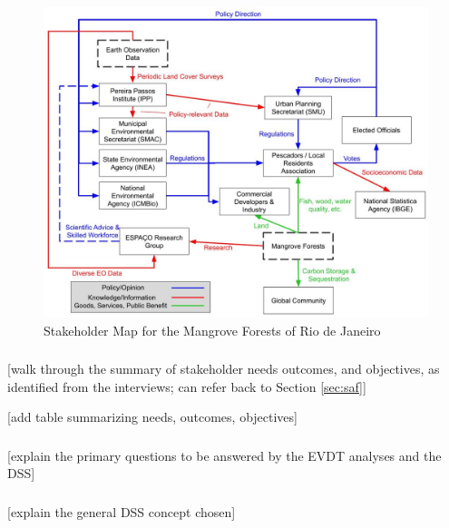 \begin{figure}[H]
	\centering
	\includegraphics[scale=0.3]{Figures/chap4/Stakeholder_Map_v2.jpg}
	\caption[Stakeholder Map for the Mangrove Forests of Rio de Janeiro]{Stakeholder Map for the Mangrove Forests of Rio de Janeiro}
	\label{fig:rio_stakemap}
\end{figure}

\subsubsection{}

[walk through the summary of stakeholder needs outcomes, and objectives, as identified from the interviews; can refer back to Section \ref{sec:saf}]

[add table summarizing needs, outcomes, objectives]

\subsubsection{}

[explain the primary questions to be answered by the EVDT analyses and the DSS]


\subsubsection{}

[explain the general DSS concept chosen]

